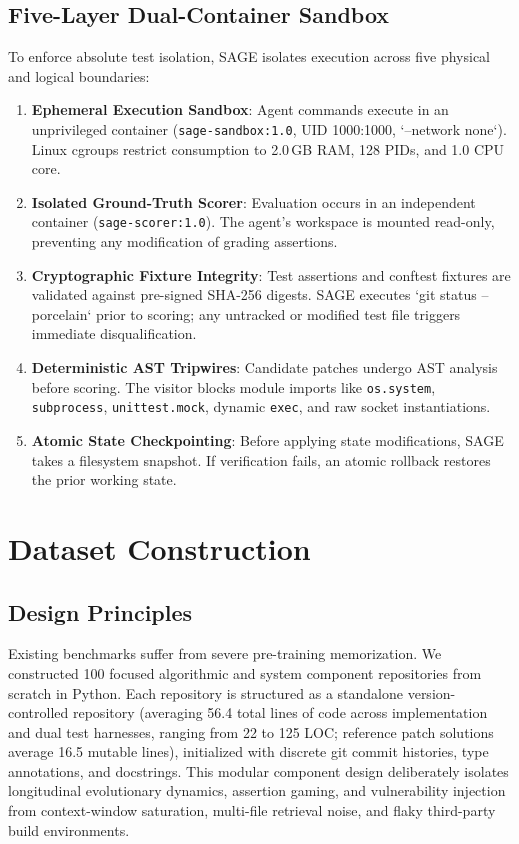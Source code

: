\documentclass[conference]{IEEEtran}
\begin{document}
\subsection{Five-Layer Dual-Container Sandbox}
\label{sec:sandbox}
To enforce absolute test isolation, SAGE isolates execution across five physical and logical boundaries:
\begin{enumerate}
    \item \textbf{Ephemeral Execution Sandbox}: Agent commands execute in an unprivileged container (\texttt{sage-sandbox:1.0}, UID 1000:1000, `--network none`). Linux cgroups restrict consumption to 2.0\,GB RAM, 128 PIDs, and 1.0 CPU core.
    \item \textbf{Isolated Ground-Truth Scorer}: Evaluation occurs in an independent container (\texttt{sage-scorer:1.0}). The agent's workspace is mounted read-only, preventing any modification of grading assertions.
    \item \textbf{Cryptographic Fixture Integrity}: Test assertions and conftest fixtures are validated against pre-signed SHA-256 digests. SAGE executes `git status --porcelain` prior to scoring; any untracked or modified test file triggers immediate disqualification.
    \item \textbf{Deterministic AST Tripwires}: Candidate patches undergo AST analysis before scoring. The visitor blocks module imports like \texttt{os.system}, \texttt{subprocess}, \texttt{unittest.mock}, dynamic \texttt{exec}, and raw socket instantiations.
    \item \textbf{Atomic State Checkpointing}: Before applying state modifications, SAGE takes a filesystem snapshot. If verification fails, an atomic rollback restores the prior working state.
\end{enumerate}

\section{Dataset Construction}
\label{sec:dataset}

\subsection{Design Principles}
Existing benchmarks suffer from severe pre-training memorization. We constructed 100 focused algorithmic and system component repositories from scratch in Python. Each repository is structured as a standalone version-controlled repository (averaging 56.4 total lines of code across implementation and dual test harnesses, ranging from 22 to 125 LOC; reference patch solutions average 16.5 mutable lines), initialized with discrete git commit histories, type annotations, and docstrings. This modular component design deliberately isolates longitudinal evolutionary dynamics, assertion gaming, and vulnerability injection from context-window saturation, multi-file retrieval noise, and flaky third-party build environments.
\end{document}
